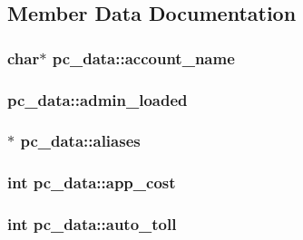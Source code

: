 \subsection{Member Data Documentation}
\hypertarget{structpc__data_a5f4d1fc83ffd2a3f2a43387740c3b560}{
\subsubsection[{account\-\_\-name}]{\setlength{\rightskip}{0pt plus 5cm}char$\ast$ pc\-\_\-data\-::account\-\_\-name}}\label{structpc__data_a5f4d1fc83ffd2a3f2a43387740c3b560}
\hypertarget{structpc__data_a364a4e2dcd67502d6194922df3840604}{
\subsubsection[{admin\-\_\-loaded}]{ pc\-\_\-data\-::admin\-\_\-loaded}}\label{structpc__data_a364a4e2dcd67502d6194922df3840604}
\hypertarget{structpc__data_ad5a38f06bacdf18b478fa3471f021284}{
\subsubsection[{aliases}]{$\ast$ pc\-\_\-data\-::aliases}}\label{structpc__data_ad5a38f06bacdf18b478fa3471f021284}
\hypertarget{structpc__data_a21dd830cee78670dd342d4ba8ad48d0b}{
\subsubsection[{app\-\_\-cost}]{\setlength{\rightskip}{0pt plus 5cm}int pc\-\_\-data\-::app\-\_\-cost}}\label{structpc__data_a21dd830cee78670dd342d4ba8ad48d0b}
\hypertarget{structpc__data_a609ace619c184e5295c99b84908b088e}{
\subsubsection[{auto\-\_\-toll}]{\setlength{\rightskip}{0pt plus 5cm}int pc\-\_\-data\-::auto\-\_\-toll}}\label{structpc__data_a609ace619c184e5295c99b84908b088e}
